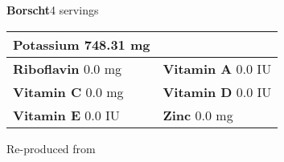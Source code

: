 \documentclass[../recipe-collections/cooking.tex]{subfiles}
\begin{document}
\begin{recipe}{\textbf{Borscht}}{4 servings}{}
\begin{tabular}{|lr|}
      \multicolumn{1}{|l|}{\textbf{Potassium} \textrm{ 748.31  mg}}     \\ \hline
      \textbf{Riboflavin} \textrm{ 0.0  mg}  &
      \multicolumn{1}{|l|}{\textbf{Vitamin A} \textrm{ 0.0 IU }}        \\ \hline
      \textbf{Vitamin C} \textrm{ 0.0  mg}      &
      \multicolumn{1}{|l|}{\textbf{Vitamin D} \textrm{ 0.0  IU}}         \\ \hline
      \textbf{Vitamin E} \textrm{ 0.0  IU}     &
      \multicolumn{1}{|l|}{\textbf{Zinc} \textrm{ 0.0  mg}}               \\ \hline
  \end{tabular}

  \freeform{}\hrulefill{}

\end{recipe}

Re-produced from  
\autocite{FoodAndWine_ChunkyBorscht_2019}
\end{document}
